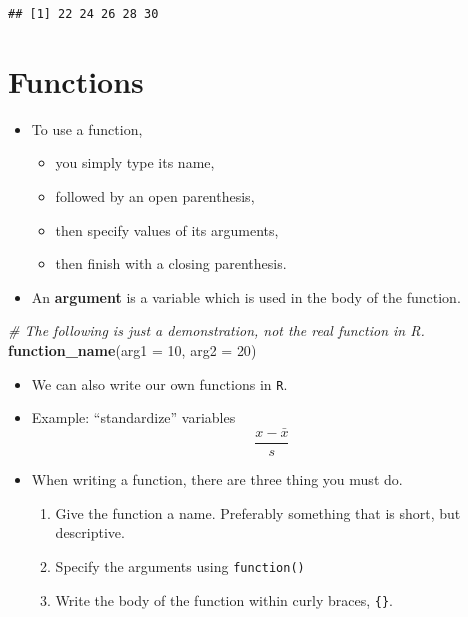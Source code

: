 \documentclass[]{book}
\newenvironment{Shaded}{\begin{snugshade}}{\end{snugshade}}
\newcommand{\CommentTok}[1]{\textcolor[rgb]{0.56,0.35,0.01}{\textit{#1}}}
\newcommand{\DataTypeTok}[1]{\textcolor[rgb]{0.13,0.29,0.53}{#1}}
\newcommand{\DecValTok}[1]{\textcolor[rgb]{0.00,0.00,0.81}{#1}}
\newcommand{\KeywordTok}[1]{\textcolor[rgb]{0.13,0.29,0.53}{\textbf{#1}}}
\newcommand{\NormalTok}[1]{#1}
\providecommand{\tightlist}{%
  \setlength{\itemsep}{0pt}\setlength{\parskip}{0pt}}
\begin{document}
\begin{verbatim}
## [1] 22 24 26 28 30
\end{verbatim}

\hypertarget{functions}{%
\section{Functions}\label{functions}}

\begin{itemize}
\tightlist
\item
  To use a function,

  \begin{itemize}
  \tightlist
  \item
    you simply type its name,
  \item
    followed by an open parenthesis,
  \item
    then specify values of its arguments,
  \item
    then finish with a closing parenthesis.
  \end{itemize}
\item
  An \textbf{argument} is a variable which is used in the body of the function.
\end{itemize}

\begin{Shaded}
\begin{Highlighting}[]
\CommentTok{# The following is just a demonstration, not the real function in R.}
\KeywordTok{function_name}\NormalTok{(}\DataTypeTok{arg1 =} \DecValTok{10}\NormalTok{, }\DataTypeTok{arg2 =} \DecValTok{20}\NormalTok{)}
\end{Highlighting}
\end{Shaded}

\begin{itemize}
\item
  We can also write our own functions in \texttt{R}.
\item
  Example: ``standardize'' variables
  \[
  \frac{x - \bar{x}}{s}
  \]
\item
  When writing a function, there are three thing you must do.

  \begin{enumerate}
  \def\labelenumi{\arabic{enumi}.}
  \tightlist
  \item
    Give the function a name. Preferably something that is short, but descriptive.
  \item
    Specify the arguments using \texttt{function()}
  \item
    Write the body of the function within curly braces, \texttt{\{\}}.
  \end{enumerate}
\end{itemize}
\end{document}

